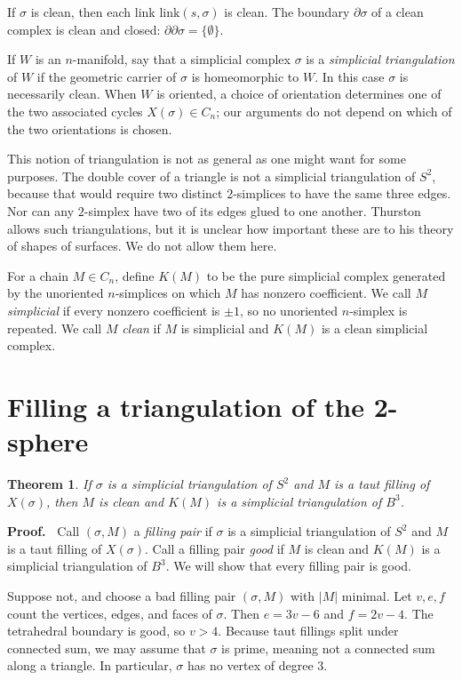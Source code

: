 \documentclass[12pt]{article}
\newtheorem{theorem}{Theorem}
\newcommand{\proofstart}{{\noindent \bf Proof.\ }}
\def\del{\partial}
\newcommand{\kw}{\mathrm}
\newcommand{\link}{\kw{link}}
\begin{document}
If $\sigma$ is clean, then each link $\link(s,\sigma)$ is clean.
The boundary $\del \sigma$ of a clean complex is clean and closed:
$\del \del \sigma = \{\emptyset\}$.

If $W$ is an $n$-manifold, say that a simplicial complex $\sigma$
is a \emph{simplicial triangulation} of $W$
if the geometric carrier of $\sigma$ is homeomorphic to $W$.
In this case $\sigma$ is necessarily clean.
When $W$ is oriented, a choice of orientation determines one of the
two associated cycles $X(\sigma) \in C_n$; our arguments do not depend
on which of the two orientations is chosen.

This notion of triangulation is not as general as one might want
for some purposes.
The double cover of a triangle is not a simplicial triangulation
of $S^2$,
because that would require two distinct
$2$-simplices to have the same three edges.
Nor can any $2$-simplex have two of its edges
glued to one another.
Thurston
\cite{thurston:shapes}
allows such triangulations,
but it is unclear how important these are to
his theory of shapes of surfaces.
We do not allow them here.

For a chain $M \in C_n$, define $K(M)$ to be the pure simplicial
complex generated by the unoriented $n$-simplices on which $M$ has
nonzero coefficient.
We call $M$ \emph{simplicial} if every nonzero coefficient is $\pm 1$,
so no unoriented $n$-simplex is repeated.
We call $M$ \emph{clean} if $M$ is simplicial and $K(M)$ is a clean
simplicial complex.

\section{Filling a triangulation of the 2-sphere}

\begin{theorem} \label{th2}
If $\sigma$ is a simplicial triangulation of $S^2$ and $M$ is a taut
filling of $X(\sigma)$, then $M$ is clean and $K(M)$ is a simplicial
triangulation of $B^3$.
\end{theorem}

\proofstart
Call $(\sigma,M)$ a \emph{filling pair} if $\sigma$ is a simplicial
triangulation of $S^2$ and $M$ is a taut filling of $X(\sigma)$.
Call a filling pair \emph{good} if $M$ is clean and $K(M)$ is a
simplicial triangulation of $B^3$.
We will show that every filling pair is good.

Suppose not, and choose a bad filling pair $(\sigma,M)$ with $|M|$
minimal.  Let $v,e,f$ count the vertices, edges, and faces of $\sigma$.
Then $e=3v-6$ and $f=2v-4$.
The tetrahedral boundary is good, so $v>4$.
Because taut fillings split under connected sum, we may assume that
$\sigma$ is prime, meaning not a connected sum along a triangle.
In particular, $\sigma$ has no vertex of degree $3$.
\end{document}
